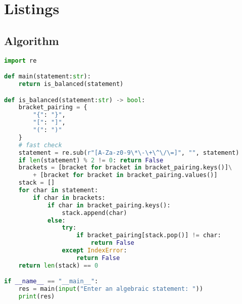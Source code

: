 \documentclass{report}
\begin{document}
\section{Listings}
\subsection{Algorithm}
\begin{lstlisting}[language=python]
import re

def main(statement:str):
    return is_balanced(statement)

def is_balanced(statement:str) -> bool:
    bracket_pairing = {
        "{": "}",
        "[": "]",
        "(": ")"
    }
    # fast check
    statement = re.sub(r"[A-Za-z0-9\*\-\+\^\/\=]", "", statement)
    if len(statement) % 2 != 0: return False
    brackets = [bracket for bracket in bracket_pairing.keys()]\
        + [bracket for bracket in bracket_pairing.values()]
    stack = []
    for char in statement:
        if char in brackets:
            if char in bracket_pairing.keys():
                stack.append(char)
            else:
                try:
                    if bracket_pairing[stack.pop()] != char:
                        return False
                except IndexError:
                    return False
    return len(stack) == 0

if __name__ == "__main__":
    res = main(input("Enter an algebraic statement: "))
    print(res)
\end{lstlisting}
\end{document}

